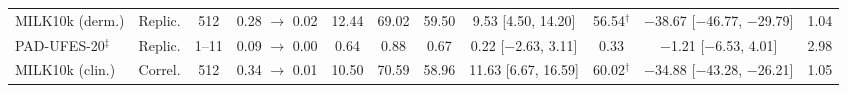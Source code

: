 \begin{table}[tp]
{\begin{tabular}{llccccccccc}
MILK10k (derm.) & Replic. & 512 & 0.28 $\to$ 0.02 & 12.44 & 69.02 & 59.50 & 9.53 [4.50, 14.20] & 56.54$^\dagger$ & \ensuremath{-}38.67 [\ensuremath{-}46.77, \ensuremath{-}29.79] & 1.04\\
PAD-UFES-20$^\ddagger$ & Replic. & 1--11 & 0.09 $\to$ 0.00 & 0.64 & 0.88 & 0.67 & 0.22 [\ensuremath{-}2.63, 3.11] & 0.33 & \ensuremath{-}1.21 [\ensuremath{-}6.53, 4.01] & 2.98\\
MILK10k (clin.) & Correl. & 512 & 0.34 $\to$ 0.01 & 10.50 & 70.59 & 58.96 & 11.63 [6.67, 16.59] & 60.02$^\dagger$ & \ensuremath{-}34.88 [\ensuremath{-}43.28, \ensuremath{-}26.21] & 1.05\\
\bottomrule\end{tabular}}\end{table}
